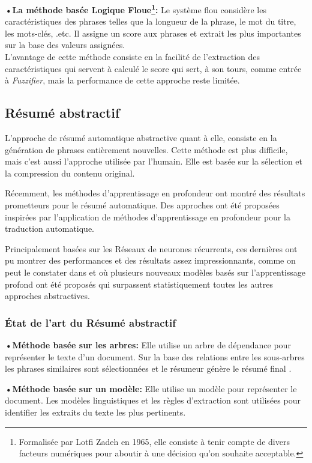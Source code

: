         \textbf{•La méthode basée Logique Floue\footnote{Formalisée par Lotfi Zadeh en 1965, elle consiste à tenir compte de divers facteurs numériques pour aboutir à une décision qu'on souhaite acceptable.}:} Le système flou considère les caractéristiques des phrases telles que la longueur de la phrase, le mot du titre, les mots-clés, .etc\cite{10}. Il assigne un score aux phrases et extrait les plus importantes sur la base des valeurs assignées.\\
        L'avantage de cette méthode consiste en la facilité de l'extraction des caractéristiques qui servent à calculé le score qui sert, à son tours, comme entrée à \emph{Fuzzifier}, mais la performance de cette approche reste limitée\cite{surveysummarization}.

    \subsection{Résumé abstractif}
        L'approche de résumé automatique abstractive quant à elle, consiste en la génération de phrases entièrement nouvelles. Cette méthode est plus difficile, mais c'est aussi l'approche utilisée par l'humain. Elle est basée sur la sélection et la compression du contenu original.

        Récemment, les méthodes d'apprentissage en profondeur ont montré des résultats prometteurs pour le résumé automatique. Des approches ont été proposées inspirées par l'application de méthodes d'apprentissage en profondeur pour la traduction automatique.

        Principalement basées sur les Réseaux de neurones récurrents, ces dernières ont pu montrer des performances et des résultats assez impressionnants, comme on peut le constater dans \cite{atsuss} et \cite{ruch} où plusieurs nouveaux modèles basés sur l'apprentissage profond ont été proposés qui surpassent statistiquement toutes les autres approches abstractives.

        \subsubsection{État de l'art du Résumé abstractif}
        \textbf{•Méthode basée sur les arbres:} Elle utilise un arbre de dépendance pour représenter le texte d'un document. Sur la base des relations entre les sous-arbres les phrases similaires sont sélectionnées et le résumeur génère le résumé final \cite{5}.
            
        \textbf{•Méthode basée sur un modèle:} Elle utilise un modèle pour représenter le document. Les modèles linguistiques et les règles d'extraction sont utilisées pour identifier les extraits du texte les plus pertinents\cite{5}.

